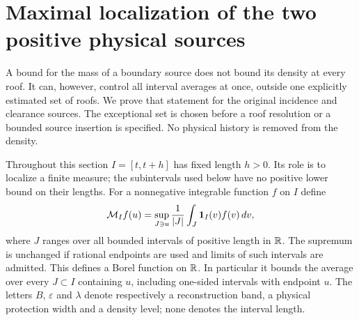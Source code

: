 \section{Maximal localization of the two positive physical sources}
\label{sec:v56-maximal-layers}
A bound for the mass of a boundary source does not bound its density
at every roof. It can, however, control all interval averages at once,
outside one explicitly estimated set of roofs. We prove that statement
for the original incidence and clearance sources. The exceptional set
is chosen before a roof resolution or a bounded source insertion is
specified. No physical history is removed from the density.

Throughout this section $I=[t,t+h]$ has fixed length $h>0$. Its role
is to localize a finite measure; the subintervals used below have no
positive lower bound on their lengths. For a nonnegative integrable
function $f$ on $I$ define
\begin{equation}\label{eq:v56-maximal-definition}
 \mathcal M_I f(u)=\sup_{J\ni u}\frac1{|J|}
                   \int_J\one_I(v)f(v)\,dv,
\end{equation}
where $J$ ranges over all bounded intervals of positive length in
$\mathbb R$. The supremum is unchanged if rational endpoints are used and
limits of such intervals are admitted. This defines a Borel function
on $\mathbb R$. In particular it bounds the average over every $J\subset I$
containing $u$, including one-sided intervals with endpoint $u$.
The letters $B$, $\varepsilon$ and $\lambda$ denote respectively a
reconstruction band, a physical protection width and a density level;
none denotes the interval length.

